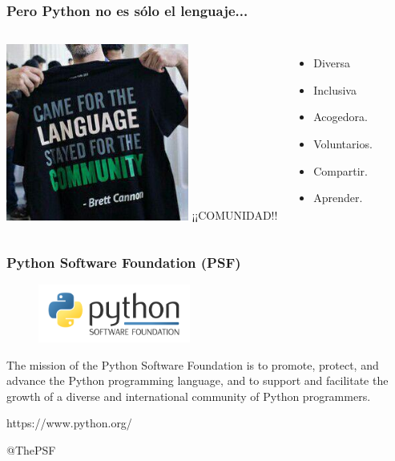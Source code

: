 \documentclass[18pt]{beamer}
\begin{document}
\begin{frame}

	\frametitle{Pero Python no es sólo el lenguaje...}
	   
	\begin{columns}
		\centering
			\includegraphics[width=6cm]{images/tshirt_quote.jpg}
		\large ¡¡COMUNIDAD!!
		\vspace{0.5cm}
		\begin{itemize}
			\setlength\itemsep{0.6em}		
			\item Diversa
			\item Inclusiva
			\item Acogedora.
			\vspace{0.5cm}
			\item Voluntarios.
			\item Compartir.
			\item Aprender.  
		\end{itemize}
	\end{columns}
	
\end{frame}


\begin{frame}

	\frametitle{Python Software Foundation (PSF)}
	
	\begin{figure}
		\includegraphics[width=5cm]{images/psf.png}
	\end{figure}
	
	The mission of the Python Software Foundation is to promote, protect, 
	and advance the Python programming language, and to support and 
	facilitate the growth of a diverse and international 
	community of Python programmers.


	\vspace{0.6cm}    
	\centerline{https://www.python.org/}
	
	\vspace{0.4cm}
	\centerline{@ThePSF}
	
\end{frame}
\end{document}

